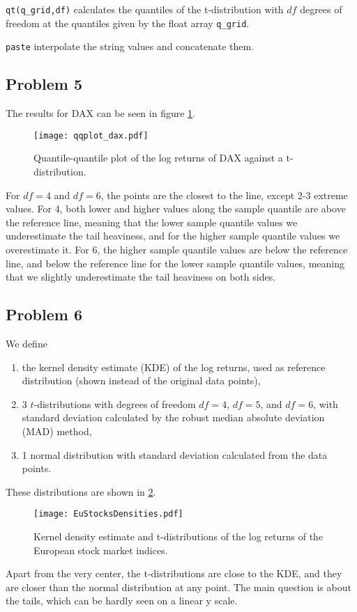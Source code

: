 \documentclass{article}
\begin{document}
\texttt{qt(q\_grid,df)} calculates the quantiles of the t-distribution
with $df$ degrees of freedom at the quantiles
given by the float array \texttt{q\_grid}.

\texttt{paste} interpolate the string values and concatenate them.
\subsection{Problem 5}
The results for DAX can be seen in figure \ref{fig:qqplot_dax}.
\begin{figure}[htbp]
    \centering
    \texttt{[image: qqplot\_dax.pdf]}
    \caption{Quantile-quantile plot of the log returns of DAX against a t-distribution.}
    \label{fig:qqplot_dax}
\end{figure}

For $df=4$ and $df=6$, the points are the closest to the line, except 2-3 extreme values.
For 4, both lower and higher values along the sample quantile are above the reference line,
meaning that the lower sample quantile values we underestimate the tail heaviness,
and for the higher sample quantile values we overestimate it.
For 6, the higher sample quantile values are below the reference line,
and below the reference line for the lower sample quantile values,
meaning that we slightly underestimate the tail heaviness on both sides.

\subsection{Problem 6}
We define
\begin{enumerate}
    \item the kernel density estimate (KDE) of the log returns, used as reference distribution (shown instead of the original data points),
    \item 3 $t$-distributions with degrees of freedom $df=4$, $df=5$, and $df=6$, with standard deviation calculated by the robust median absolute deviation (MAD) method,
    \item 1 normal distribution with standard deviation calculated from the data points.
\end{enumerate}
These distributions are shown in \ref{fig:EuStocksDensities}.
\begin{figure}[htbp]
    \centering
    \texttt{[image: EuStocksDensities.pdf]}
    \caption{Kernel density estimate and t-distributions of the log returns of the European stock market indices.}
    \label{fig:EuStocksDensities}
\end{figure}
Apart from the very center, the t-distributions are close to the KDE,
and they are closer than the normal distribution at any point.
The main question is about the tails, which can be hardly seen on a linear y scale.
\end{document}
